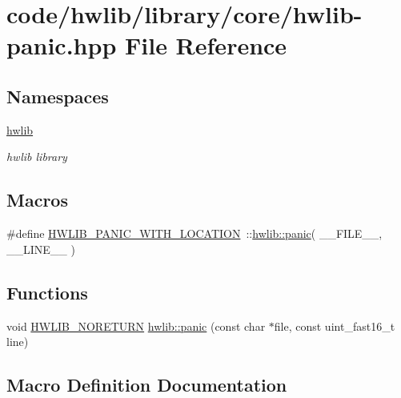 \hypertarget{hwlib-panic_8hpp}{}\section{code/hwlib/library/core/hwlib-\/panic.hpp File Reference}
\label{hwlib-panic_8hpp}
\subsection*{Namespaces}
\begin{DoxyCompactItemize}
\item 
 \hyperlink{namespacehwlib}{hwlib}
\begin{DoxyCompactList}\small\item\em hwlib library \end{DoxyCompactList}\end{DoxyCompactItemize}
\subsection*{Macros}
\begin{DoxyCompactItemize}
\item 
\#define \hyperlink{hwlib-panic_8hpp_a63e41f8f1231b208819549fe26a58440}{H\+W\+L\+I\+B\+\_\+\+P\+A\+N\+I\+C\+\_\+\+W\+I\+T\+H\+\_\+\+L\+O\+C\+A\+T\+I\+ON}~\+::\hyperlink{namespacehwlib_a80caa11d8c2b6dd8d5a6655273e3c7d3}{hwlib\+::panic}( \+\_\+\+\_\+\+F\+I\+L\+E\+\_\+\+\_\+, \+\_\+\+\_\+\+L\+I\+N\+E\+\_\+\+\_\+ )
\end{DoxyCompactItemize}
\subsection*{Functions}
\begin{DoxyCompactItemize}
\item 
void \hyperlink{hwlib-defines_8hpp_aef311f1f416fdcbd1fa22376dcc01029}{H\+W\+L\+I\+B\+\_\+\+N\+O\+R\+E\+T\+U\+RN} \hyperlink{namespacehwlib_a80caa11d8c2b6dd8d5a6655273e3c7d3}{hwlib\+::panic} (const char $\ast$file, const uint\+\_\+fast16\+\_\+t line)
\end{DoxyCompactItemize}


\subsection{Macro Definition Documentation}
\mbox{\label{hwlib-panic_8hpp_a63e41f8f1231b208819549fe26a58440}} 
